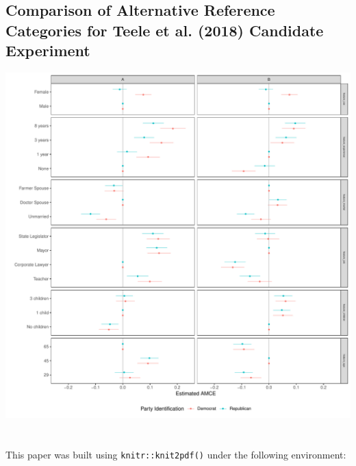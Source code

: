 \documentclass[a4paper,12pt]{article}\usepackage[]{graphicx}\usepackage[]{color}
\makeatletter
\def\maxwidth{ %
  \ifdim\Gin@nat@width>\linewidth
    \linewidth
  \else
    \Gin@nat@width
  \fi
}
\newenvironment{knitrout}{}{} %
\makeatother
\begin{document}
\clearpage

\subsection{Comparison of Alternative Reference Categories for Teele et al. (2018) Candidate Experiment}




\begin{knitrout}
\color{fgcolor}
\includegraphics[width=\maxwidth]{figure/tkr_subgroup_example_plot-1} 

\end{knitrout}


\clearpage

\section*{}

\noindent This paper was built using \texttt{knitr::knit2pdf()} under the following environment:
\end{document}
